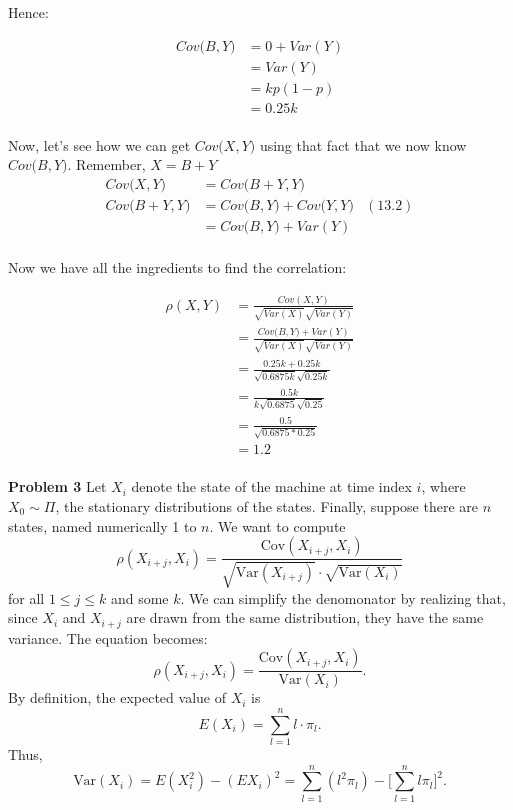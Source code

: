 \documentclass[12pt]{article}
\begin{document}
Hence:

\begin{equation*}
	\begin{aligned}
	Cov\big(B,Y\big) &= 0 + Var(Y)\\
	&= Var(Y)\\
	&= kp(1-p)\\
	&= 0.25k\\
	\end{aligned}
\end{equation*}

Now, let's see how we can get $Cov\big(X,Y\big)$ using that fact that we now know $Cov\big(B,Y\big)$. Remember, $X=B+Y$
\begin{equation*}
	\begin{aligned}
	Cov\big(X,Y\big) &= Cov\big(B+Y,Y\big)\\
	Cov\big(B+Y,Y\big) &= Cov\big(B,Y\big) + Cov\big(Y,Y\big)&(\textrm{13.2})\\
	&= Cov\big(B,Y\big) + Var(Y)\\
	\end{aligned}
\end{equation*}

Now we have all the ingredients to find the correlation:


\begin{equation*}
	\begin{aligned}
	\rho(X,Y) &= \frac{Cov(X, Y)}{\sqrt{Var(X)}\sqrt{Var(Y)}} \\
	       &= \frac{Cov\big(B,Y\big) + Var(Y)}{\sqrt{Var(X)}\sqrt{Var(Y)}} \\
	       &= \frac{0.25k + 0.25k}{\sqrt{0.6875k}\sqrt{0.25k}} \\
	       &= \frac{0.5k}{k\sqrt{0.6875}\sqrt{0.25}} \\
	       &= \frac{0.5}{\sqrt{0.6875*0.25}} \\
	       &= 1.2\\
	\end{aligned}
\end{equation*}


\pagebreak
\textbf{Problem 3} 
Let $X_i$ denote the state of the machine at time index $i$, where $X_0  
\sim \Pi$, the stationary distributions of the states. Finally, suppose there are $n$ states, 
named numerically 1 to $n$. We want to compute
$$\rho(X_{i+j}, X_i) = \frac{\text{Cov}(X_{i+j}, X_i)}
                 {\sqrt{\text{Var}(X_{i+j})} \cdot \sqrt{\text{Var}(X_i)}} $$ 
for all $1 \le j \le k$ and some $k$. We can simplify the denomonator by realizing 
that, since $X_i$ and $X_{i+j}$ are drawn from the same distribution, they have
the same variance. The equation becomes: 
$$\rho(X_{i+j}, X_i) = \frac{\text{Cov}(X_{i+j}, X_i)}
                 {\text{Var}(X_{i})}. $$
By definition, the expected value of $X_i$ is
$$ E(X_i) = \sum_{l=1}^n{l\cdot\pi_l}. $$ 
Thus, 
$$ \text{Var}(X_i) = E(X_i^2) - (EX_i)^2 =
  \sum_{l=1}^n{(l^2\pi_l)} - \Big[ \sum_{l=1}^n{l \pi_l} \Big]^2.$$ 
\end{document}

